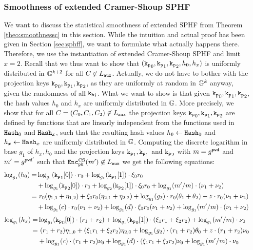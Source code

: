 \subsubsection{Smoothness of extended Cramer-Shoup SPHF}\label{sec:excssmoothness}
We want to discuss the statistical smoothness of extended \ac{SPHF} from Theorem \ref{theo:smoothnessc} in this section.
While the intuition and actual proof has been given in Section \ref{sec:sphff}, we want to formulate what actually happens there.
Therefore, we use the instantiation of extended Cramer-Shoup \ac{SPHF} and limit $x=2$.
Recall that we thus want to show that $(\mathtt{k_p}_0,\mathtt{k_p}_1,\mathtt{k_p}_2,h_0,h_x)$ is uniformly distributed in $\mathbb{G}^{k+2}$ for all $C\not\in L_\mathtt{aux}$.
Actually, we do not have to bother with the projection keys $\mathtt{k_p}_0,\mathtt{k_p}_1,\mathtt{k_p}_2$, as they are uniformly at random in $\mathbb{G}^{k}$ anyway, given the randomness of all $\mathtt{k_h}_i$.
What we want to show is that given $\mathtt{k_p}_0,\mathtt{k_p}_1,\mathtt{k_p}_2$, the hash values $h_0$ and $h_x$ are uniformly distributed in $\mathbb{G}$.
More precisely, we show that for all $C=(C_0,C_1,C_2)\not\in L_\mathtt{aux}$ the projection keys $\mathtt{k_p}_0,\mathtt{k_p}_1,\mathtt{k_p}_2$ are defined by functions that are linearly independent from the functions used in $\mathtt{Hash}_0$ and $\mathtt{Hash}_x$, such that the resulting hash values $h_0\gets\mathtt{Hash}_0$ and $h_x\gets\mathtt{Hash}_x$ are uniformly distributed in $\mathbb{G}$.
Computing the discrete logarithm in base $g_1$ of $h_x,h_0$ and the projection keys $\mathtt{k_p}_1,\mathtt{k_p}_1$ and $\mathtt{k_p}_2$ with $m=g^{\mathtt{pwd}}$ and $m'=g^{\mathtt{pwd}'}$ such that $\mathtt{Enc}^{\mathrm{CS}}_\mathtt{pk}(m')\not\in L_\mathtt{aux}$ we get the following equations:
\begin{align}
	\log_{g_1}(h_0) =& \log_{g_1}(\mathtt{k_p}_1[0])\cdot r_0 + \log_{g_1}(\mathtt{k_p}_1[1])\cdot \xi_0r_0  \notag\\
					 & + \log_{g_1}(\mathtt{k_p}_2[0])\cdot r_0 + \log_{g_2}(\mathtt{k_p}_2[1])\cdot \xi_0r_0 + \log_{g_1}(m'/m)\cdot (\nu_1+\nu_2)  \notag\\
					=&~ r_0(\eta_{1,1}+\eta_{1,2}) + \xi_0r_0(\eta_{2,1}+\eta_{2,2}) + \log_{g_1}(g_2)\cdot r_0(\theta_1+\theta_2) + z\cdot r_0(\nu_1+\nu_2)  \label{eq:1}\\
					 & + \log_{g_1}(c)\cdot r_0(\nu_1+\nu_2) + \log_{g_1}(d)\cdot\xi_0r_0(\nu_1+\nu_2) + \log_{g_1}(m'/m)\cdot (\nu_1+\nu_2) \notag
\end{align}
\begin{align}
	\log_{g_1}(h_x) =& \log_{g_1}(\mathtt{k_p}_0[0])\cdot(r_1+r_2) + \log_{g_1}(\mathtt{k_p}_0[1])\cdot(\xi_1r_1+\xi_2r_2) + \log_{g_1}(m'/m)\cdot \nu_0  \notag\\
					=&~ (r_1+r_2)\eta_{1,0} + (\xi_1r_1+\xi_2r_2)\eta_{2,0} + \log_{g_1}(g_2)\cdot (r_1+r_2)\theta_0 + z\cdot (r_1+r_2)\nu_0 \label{eq:2}\\
					 & + \log_{g_1}(c)\cdot (r_1+r_2)\nu_0 + \log_{g_1}(d)\cdot (\xi_1r_1+\xi_2r_2)\nu_0 + \log_{g_1}(m'/m)\cdot \nu_0 \notag
\end{align}
